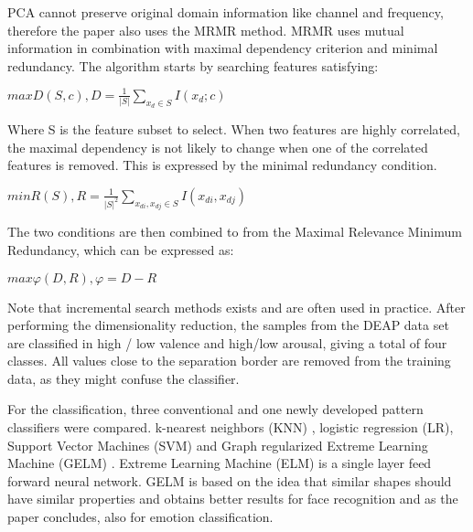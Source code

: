 \npar

PCA cannot preserve original domain information like channel and frequency, therefore the paper also uses the MRMR method. MRMR uses mutual information in combination with maximal dependency criterion and minimal redundancy. The algorithm starts by searching features satisfying:

\begin{center}
$max D(S,c), D=\frac{1}{|S|} {\displaystyle \sum_{x_d \in S}} I(x_d;c)$
\end{center}

Where S is the feature subset to select. When two features are highly correlated, the maximal dependency is not likely to change when one of the correlated features is removed. This is expressed by the minimal redundancy condition.

\begin{center}
$min R(S), R = \frac{1}{|S|^2} {\displaystyle \sum_{x_{di}, x_{dj} \in S}} I(x_{di},x_{dj})$
\end{center}

The two conditions are then combined to from the Maximal Relevance Minimum Redundancy, which can be expressed as:

\begin{center}
$max \varphi(D,R), \varphi=D-R$
\end{center}

Note that incremental search methods exists and are often used in practice. After performing the dimensionality reduction, the samples from the DEAP data set are classified in high / low valence and high/low arousal, giving a total of four classes. All values close to the separation border are removed from the training data, as they might confuse the classifier. 

\npar 

For the classification, three conventional and one newly developed pattern classifiers were compared. k-nearest neighbors (KNN) , logistic regression (LR), Support Vector Machines (SVM) and Graph regularized Extreme Learning Machine (GELM) . Extreme Learning Machine (ELM)  is a single layer feed forward neural network\citep{ELMpaper}. GELM is based on the idea that similar shapes should have similar properties and obtains better results for face recognition \citep{GELMpaper} and as the paper concludes, also for emotion classification.

